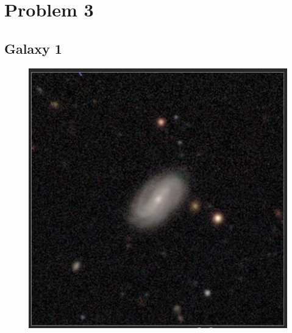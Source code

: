 \documentclass[11pt,letterpaper]{article}
\begin{document}
\section*{Problem 3}

\subsection*{Galaxy 1}
\begin{figure}[!htbp]
    \centering
    \includegraphics[width=\linewidth]{gal1.png}
\end{figure}

\newpage
\end{document}
